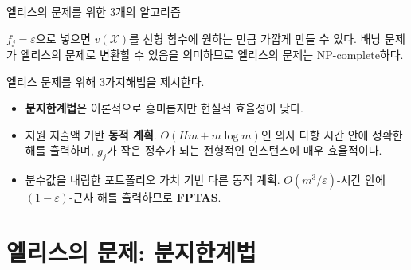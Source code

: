 \documentclass[10pt,slidestop,compress,mathserif,notheorems]{beamer}
\newif\ifen
\theoremstyle{definition}
\theoremstyle{definition}
\begin{document}
\begin{frame}{\ifen Three algorithms for Ellis's problem \else 엘리스의 문제를 위한 3개의 알고리즘\fi}
\ifen {
By setting $f_j = \varepsilon$, we can make $v(\mathcal{X})$ arbitrarily close to a linear function. This means that knapsack reduces to Ellis's problem, and therefore Ellis's problem is NP-complete.

We provide three algorithms for Ellis's problem.
\begin{itemize}
\item \textbf{Branch-and-bound} routine. Theoretically interesting but not very efficient.
\item \textbf{Dynamic program} based on total expeditures. Pseudopolynomial time, namely $O(Hm + m\log m)$, and exact. Very efficient for typical instances in which $g_j$ are small integers.
\item Another dynamic program based on truncated portfolio valuations. Yields a $(1 - \varepsilon)$-optimal solution in $O(m^3 /\varepsilon)$-time: \textbf{an FPTAS}.
\end{itemize}
} \else {
$f_j = \varepsilon$으로 넣으면 $v(\mathcal{X})$를 선형 함수에 원하는 만큼 가깝게 만들 수 있다. 배낭 문제가 엘리스의 문제로 변환할 수 있음을 의미하므로 엘리스의 문제는 NP-complete하다.

엘리스 문제를 위해 3가지해법을 제시한다.
\begin{itemize}
\item \textbf{분지한계법}은 이론적으로 흥미롭지만 현실적 효율성이 낮다.
\item 지원 지출액 기반 \textbf{동적 계획}. $O(Hm + m\log m)$인 의사 다항 시간 안에 정확한 해를 출력하며, $g_j$가 작은 정수가 되는 전형적인 인스턴스에 매우 효율적이다.
\item 분수값을 내림한 포트폴리오 가치 기반 다른 동적 계획. $O(m^3 /\varepsilon)$-시간 안에  $(1 - \varepsilon)$-근사 해를 출력하므로 \textbf{FPTAS}.
\end{itemize}

} \fi
\end{frame}





\ifen \section{Ellis's problem: Branch and bound} \else \section{엘리스의 문제: 분지한계법} \fi
\end{document}
